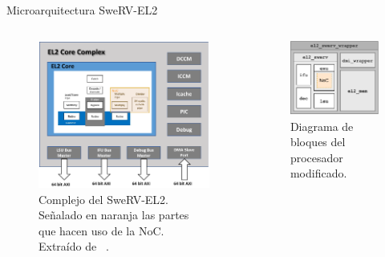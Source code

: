 \begin{frame}{Microarquitectura SweRV-EL2}
        \begin{columns}[t]
            \begin{figure}[t]
                \centering
                \includegraphics[width=.70\linewidth]{Images/swerv_architecture.drawio2.png}
                \caption{Complejo del SweRV-EL2. Señalado en naranja las partes que hacen uso de la NoC. Extraído de ~\cite{SweRVRoadmap}.}
                \label{fig:swerv_complex}
            \end{figure}%
            \pause%
            \begin{figure}[t]
                \centering
                \includegraphics[width=.75\linewidth]{Images/swerv_blocks.drawio.pdf}
                \caption{Diagrama de bloques del procesador modificado.}
                \label{fig:swerv_blocks}
            \end{figure}
        \end{columns}
\end{frame}
